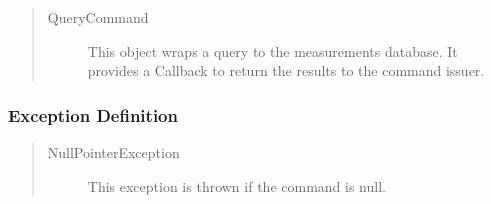 \begin{quote}
	\begin{description}
		\item[QueryCommand] This object wraps a query to the measurements database. It
		provides a Callback to return the results to the command issuer.
	\end{description} 
\end{quote}

\subsubsection{Exception Definition}

\begin{quote}
	\begin{description}
		\item[NullPointerException] This exception is thrown if the command is null.
	\end{description} 
\end{quote}